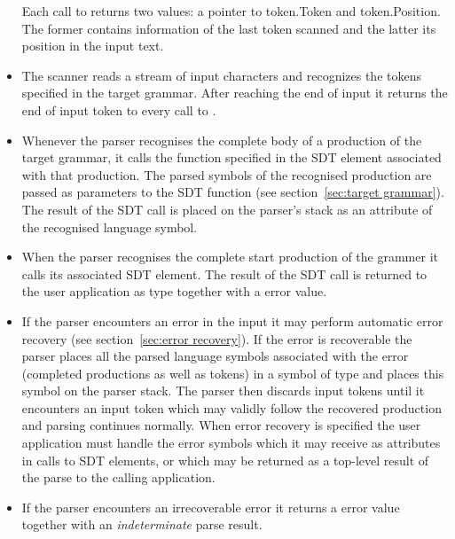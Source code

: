 \documentclass[12pt]{article}
\begin{document}
\begin{itemize}
		Each call to  returns two values: a pointer to token.Token and token.Position. The former contains information of the last token scanned and the latter its position in the input text.

		\item The scanner reads a stream of input characters and recognizes the tokens specified in the target grammar. After reaching the end of input it returns the end of input token to every call to .

		\item Whenever the parser recognises the complete body of a production of the target grammar, it calls the function specified in the SDT element associated with that production. The parsed symbols of the recognised production are passed as parameters to the SDT function (see section~\ref{sec:target grammar}). The result of the SDT call is placed on the parser's stack as an attribute of the recognised language symbol.

		\item When the parser recognises the complete start production of the grammer it calls its associated SDT element. The result of the SDT call is returned to the user application as type  together with a  error value.

		\item If the parser encounters an error in the input it may perform automatic error recovery (see section~\ref{sec:error recovery}). If the error is recoverable the parser places all the parsed language symbols associated with the error (completed productions as well as tokens) in a symbol of type  and places this symbol on the parser stack. The parser then discards input tokens until it encounters an input token which may validly follow the recovered production and parsing continues normally. When error recovery is specified the user application must handle the error symbols which it may receive as attributes in calls to SDT elements, or which may be returned as a top-level result of the parse to the calling application.

		\item If the parser encounters an irrecoverable error it returns a  error value together with an {\em indeterminate} parse result.
	\end{itemize}
\end{document}
